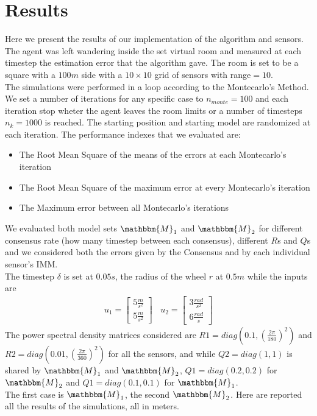\documentclass[twocolumn]{article}
\begin{document}
\section*{Results}
Here we present the results of our implementation of the algorithm and sensors. The agent was left wandering inside the set virtual room 
and measured at each timestep the estimation error that the algorithm gave. The room is set to be a square with a $100m$ side with a $10\times 10$ 
grid of sensors with range$=10$. 
\\
The simulations were performed in a loop according to the Montecarlo's Method. We set a number of iterations for any specific case to 
$n_{monte}=100$ and each iteration stop wheter the agent leaves the room limits or a number of timesteps $n_{k}=1000$ is reached. The starting
 position and starting model are randomized at each iteration.
The performance indexes that we evaluated are:
\begin{itemize}
    \item The Root Mean Square of the means of the errors at each Montecarlo's iteration
    \item The Root Mean Square of the maximum error at every Montecarlo's iteration
    \item The Maximum error between all Montecarlo's iterations
\end{itemize}
We evaluated both model sets $\mathbbm{M}_{1}$ and $\mathbbm{M}_{2}$ for different consensus rate (how many timestep between each consensus), 
different $R$s and $Q$s and we considered both the errors given by the Consensus and by each individual sensor's IMM. 
\\
The timestep $\delta$ is set at $0.05s$, the radius of the wheel $r$ at $0.5m$ while the inputs are
\begin{align*}
    u_{1}=\begin{bmatrix}
        5\frac{m}{s^{2}} \\5\frac{m}{s^{2}}
    \end{bmatrix}\ \ \ \ 
    u_{2}=\begin{bmatrix}
        3\frac{rad}{s^{2}} \\6\frac{rad}{s}
    \end{bmatrix}
\end{align*}
The power spectral density matrices considered are $R1=diag(0.1,(\frac{2\pi}{180})^{2})$ and $R2=diag(0.01,(\frac{2\pi}{360})^{2})$ for all the sensors, 
and while $Q2=diag(1,1)$ is shared by $\mathbbm{M}_{1}$ and $\mathbbm{M}_{2}$, $Q1=diag(0.2,0.2)$ for $\mathbbm{M}_{2}$ and $Q1=diag(0.1,0.1)$ for $\mathbbm{M}_{1}$.
\\
The first case is $\mathbbm{M}_{1}$, the second $\mathbbm{M}_{2}$. Here are reported all the results of the simulations, all in meters.
\end{document}
